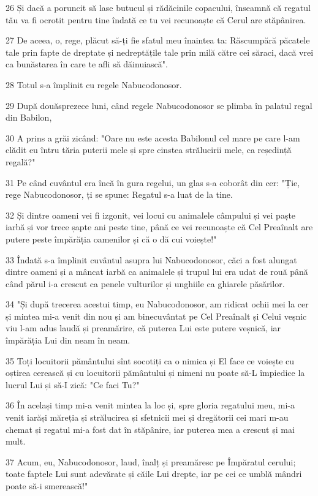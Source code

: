 \par 26 Și dacă a poruncit să lase butucul și rădăcinile copacului, înseamnă că regatul tău va fi ocrotit pentru tine îndată ce tu vei recunoaște că Cerul are stăpânirea.
\par 27 De aceea, o, rege, plăcut să-ți fie sfatul meu înaintea ta: Răscumpără păcatele tale prin fapte de dreptate și nedreptățile tale prin milă către cei săraci, dacă vrei ca bunăstarea în care te afli să dăinuiască".
\par 28 Totul s-a împlinit cu regele Nabucodonosor.
\par 29 După douăsprezece luni, când regele Nabucodonosor se plimba în palatul regal din Babilon,
\par 30 A prins a grăi zicând: "Oare nu este acesta Babilonul cel mare pe care l-am clădit eu întru tăria puterii mele și spre cinstea strălucirii mele, ca reședință regală?"
\par 31 Pe când cuvântul era încă în gura regelui, un glas s-a coborât din cer: "Ție, rege Nabucodonosor, ți se spune: Regatul s-a luat de la tine.
\par 32 Și dintre oameni vei fi izgonit, vei locui cu animalele câmpului și vei paște iarbă și vor trece șapte ani peste tine, până ce vei recunoaște că Cel Preaînalt are putere peste împărăția oamenilor și că o dă cui voiește!"
\par 33 Îndată s-a împlinit cuvântul asupra lui Nabucodonosor, căci a fost alungat dintre oameni și a mâncat iarbă ca animalele și trupul lui era udat de rouă până când părul i-a crescut ca penele vulturilor și unghiile ca ghiarele păsărilor.
\par 34 "Și după trecerea acestui timp, eu Nabucodonosor, am ridicat ochii mei la cer și mintea mi-a venit din nou și am binecuvântat pe Cel Preaînalt și Celui veșnic viu l-am adus laudă și preamărire, că puterea Lui este putere veșnică, iar împărăția Lui din neam în neam.
\par 35 Toți locuitorii pământului sînt socotiți ca o nimica și El face ce voiește cu oștirea cerească și cu locuitorii pământului și nimeni nu poate să-L împiedice la lucrul Lui și să-I zică: "Ce faci Tu?"
\par 36 În același timp mi-a venit mintea la loc și, spre gloria regatului meu, mi-a venit iarăși măreția și strălucirea și sfetnicii mei și dregătorii cei mari m-au chemat și regatul mi-a fost dat în stăpânire, iar puterea mea a crescut și mai mult.
\par 37 Acum, eu, Nabucodonosor, laud, înalț și preamăresc pe Împăratul cerului; toate faptele Lui sunt adevărate și căile Lui drepte, iar pe cei ce umblă mândri poate să-i smerească!"


